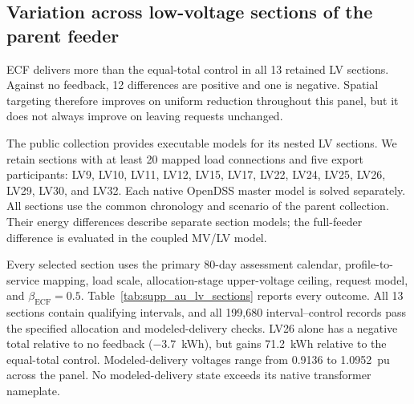 \documentclass[11pt]{article}
\begin{document}

\subsection{Variation across low-voltage sections of the parent feeder}
\label{supp:au_sections}

ECF delivers more than the equal-total control in all 13 retained LV sections.
Against no feedback, 12 differences are positive and one is negative. Spatial targeting therefore improves on uniform reduction throughout
this panel, but it does not always improve on leaving requests unchanged.

The public collection provides executable models for its nested LV sections. We
retain sections with at least 20 mapped load connections and five export
participants: LV9, LV10, LV11, LV12, LV15, LV17, LV22, LV24, LV25, LV26, LV29,
LV30, and LV32. Each native OpenDSS master model is solved separately. All
sections use the common chronology and scenario of the parent collection.
Their energy differences describe separate section models; the full-feeder
difference is evaluated in the coupled MV/LV model.

Every selected section uses the primary 80-day assessment calendar,
profile-to-service mapping, load scale, allocation-stage upper-voltage ceiling, request model, and
$\beta_{\mathrm{ECF}}=0.5$. Table~\ref{tab:supp_au_lv_sections} reports every
outcome. All 13 sections contain qualifying intervals, and all 199,680
interval--control records pass the specified allocation and modeled-delivery
checks. LV26 alone has a negative total relative to no feedback
($-3.7$~kWh), but gains 71.2~kWh relative to the equal-total control.
Modeled-delivery voltages range from 0.9136 to 1.0952~pu across the panel.
No modeled-delivery state exceeds its native transformer nameplate.
\end{document}
